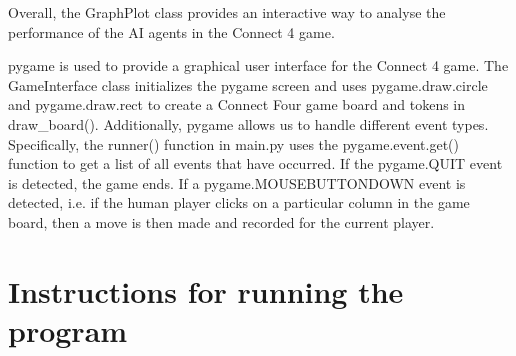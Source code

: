 \documentclass{article}
\begin{document}
Overall, the GraphPlot class provides an interactive way to analyse the performance of the AI agents in the Connect 4 game.

\bigskip
pygame is used to provide a graphical user interface for the Connect 4 game. The GameInterface class initializes the pygame screen and uses pygame.draw.circle and pygame.draw.rect to create a Connect Four game board and tokens in draw\_board(). Additionally, pygame allows us to handle different event types. Specifically, the runner() function in main.py uses the pygame.event.get() function to get a list of all events that have occurred. If the pygame.QUIT event is detected, the game ends. If a pygame.MOUSEBUTTONDOWN event is detected, i.e. if the human player clicks on a particular column in the game board, then a move is then made and recorded for the current player.


\section{Instructions for running the program}
\end{document}
